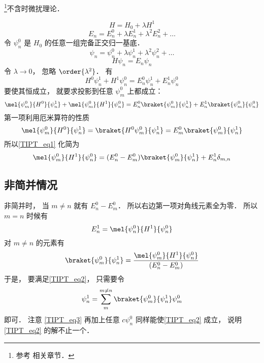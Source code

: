 
\begin{issues}
\issueDraft
\end{issues}

\footnote{参考 \cite{GriffQ} 相关章节．}不含时微扰理论．

\begin{equation}\label{TIPT_eq3}
H = H_0 + \lambda H^1
\end{equation}
\begin{equation}
E_n = E_n^0 + \lambda E_n^1 + \lambda^2 E_n^2 + \dots
\end{equation}
令 $\psi_n^0$ 是 $H_0$ 的任意一组完备正交归一基底．
\begin{equation}
\psi_n = \psi_n^0 + \lambda\psi_n^1 + \lambda^2 \psi_n^2 + \dots
\end{equation}
\begin{equation}
H \psi_n = E_n \psi_n
\end{equation}
令 $\lambda \to 0$， 忽略 $\order{\lambda^2}$． 有
\begin{equation}
H^0\psi_n^1 + H^1 \psi_n^0 = E_n^0 \psi_n^1 + E_n^1 \psi_n^0
\end{equation}
要使其恒成立， 就要求投影到任意 $\psi_m^0$ 上都成立：
\begin{equation}\label{TIPT_eq1}
\mel{\psi_m^0}{H^0}{\psi_n^1} + \mel{\psi_m^0}{H^1}{\psi_n^0} = E_n^0 \braket{\psi_m^0}{\psi_n^1} + E_n^1 \braket{\psi_m^0}{\psi_n^0}
\end{equation}
第一项利用厄米算符的性质
\begin{equation}
\mel{\psi_m^0}{H^0}{\psi_n^1} = \braket{H^0\psi_m^0}{\psi_n^1} = E_m^0\braket{\psi_m^0}{\psi_n^1}
\end{equation}
所以\autoref{TIPT_eq1} 化简为
\begin{equation}\label{TIPT_eq2}
\mel{\psi_m^0}{H^1}{\psi_n^0} = (E_n^0 - E_m^0) \braket{\psi_m^0}{\psi_n^1} + E_n^1 \delta_{m,n}
\end{equation}

\subsection{非简并情况}
非简并时， 当 $m\ne n$ 就有 $E_n^0 - E_m^0$． 所以右边第一项对角线元素全为零． 所以 $m = n$ 时候有
\begin{equation}
E_n^1 = \mel{\psi_n^0}{H^1}{\psi_n^0}
\end{equation}
对 $m \ne n$ 的元素有
\begin{equation}
\braket{\psi_m^0}{\psi_n^1} = \frac{\mel{\psi_m^0}{H^1}{\psi_n^0}}{(E_n^0 - E_m^0)}
\end{equation}
于是， 要满足\autoref{TIPT_eq2}， 只需要令
\begin{equation}
\psi_n^1 = \sum_m^{m\ne n} \braket{\psi_m^0}{\psi_n^1} \psi_m^0
\end{equation}
即可． 注意 \autoref{TIPT_eq3} 再加上任意 $c \psi_n^0$ 同样能使\autoref{TIPT_eq2} 成立， 说明\autoref{TIPT_eq2} 的解不止一个．

